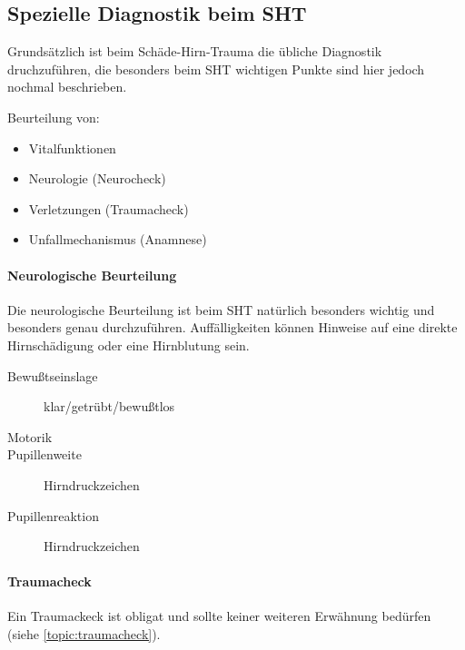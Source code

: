\subsection{Spezielle Diagnostik beim SHT}

Grundsätzlich ist beim Schäde-Hirn-Trauma die übliche
Diagnostik druchzuführen, die besonders beim SHT wichtigen
Punkte sind hier jedoch nochmal beschrieben.

Beurteilung von:
\begin{itemize}
	\item Vitalfunktionen
	\item Neurologie (Neurocheck)
	\item Verletzungen (Traumacheck)
	\item Unfallmechanismus (Anamnese)
\end{itemize}

\paragraph{Neurologische Beurteilung}

Die neurologische Beurteilung ist beim SHT natürlich
besonders wichtig und besonders genau durchzuführen.
Auffälligkeiten können Hinweise auf eine direkte
Hirnschädigung oder eine Hirnblutung sein. 

\begin{description}
\item[Bewu{\ss}tseinslage] klar/getr\"ubt/bewu{\ss}tlos
\item[Motorik] 
\item[Pupillenweite] Hirndruckzeichen
\item[Pupillenreaktion] Hirndruckzeichen
\end{description}

\paragraph{Traumacheck} Ein Traumackeck ist obligat
und sollte keiner weiteren Erwähnung bedürfen (siehe
\ref{topic:traumacheck}).





